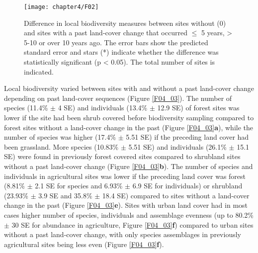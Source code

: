 \clearpage
\begin{wrapfigure}{r}{.5\textwidth}
\texttt{[image: chapter4/F02]}
\caption{ Difference in local biodiversity measures between sites without ($0$) and sites with a past land-cover change that occurred $\leq$ 5 years, > 5-10 or over 10 years ago. The error bars show the predicted standard error and stars (*) indicate whether the difference was statistically significant (p < 0.05). The total number of sites is indicated. }
\label{F04_02}
\end{wrapfigure}

Local biodiversity varied between sites with and without a past land-cover change depending on past land-cover sequences (Figure \ref{F04_03}). The number of species (11.4\% $\pm$ 4 SE) and individuals (13.4\% $\pm$ 12.9 SE) of forest sites was lower if the site had been shrub covered before biodiversity sampling compared to forest sites without a land-cover change in the past (Figure \ref{F04_03}\textbf{a}), while the number of species was higher (17.4\% $\pm$ 5.51 SE) if the preceding land cover had been grassland. More species (10.83\% $\pm$ 5.51 SE) and individuals (26.1\% $\pm$ 15.1 SE) were found in previously forest covered sites compared to shrubland sites without a past land-cover change (Figure \ref{F04_03}\textbf{b}). The number of species and individuals in agricultural sites was lower if the preceding land cover was forest (8.81\% $\pm$ 2.1 SE for species and 6.93\% $\pm$ 6.9 SE for individuals) or shrubland (23.93\% $\pm$ 3.9 SE and 35.8\% $\pm$ 18.4 SE) compared to sites without a land-cover change in the past (Figure \ref{F04_03}\textbf{e}). Sites with urban land cover had in most cases higher number of species, individuals and assemblage evenness (up to 80.2\% $\pm$ 30 SE for abundance in agriculture, Figure \ref{F04_03}\textbf{f}) compared to urban sites without a past land-cover change, with only species assemblages in previously agricultural sites being less even (Figure \ref{F04_03}\textbf{f}).

